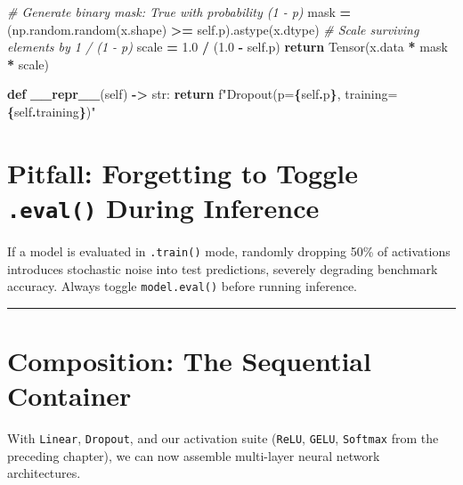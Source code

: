 \documentclass[
  letterpaper,
]{scrbook}
\newenvironment{Shaded}{\begin{snugshade}}{\end{snugshade}}
\newcommand{\BuiltInTok}[1]{#1}
\newcommand{\CommentTok}[1]{\textcolor[rgb]{0.56,0.35,0.01}{\textit{#1}}}
\newcommand{\ControlFlowTok}[1]{\textcolor[rgb]{0.13,0.29,0.53}{\textbf{#1}}}
\newcommand{\FloatTok}[1]{\textcolor[rgb]{0.00,0.00,0.81}{#1}}
\newcommand{\FunctionTok}[1]{\textcolor[rgb]{0.13,0.29,0.53}{\textbf{#1}}}
\newcommand{\KeywordTok}[1]{\textcolor[rgb]{0.13,0.29,0.53}{\textbf{#1}}}
\newcommand{\NormalTok}[1]{#1}
\newcommand{\OperatorTok}[1]{\textcolor[rgb]{0.81,0.36,0.00}{\textbf{#1}}}
\newcommand{\SpecialCharTok}[1]{\textcolor[rgb]{0.81,0.36,0.00}{\textbf{#1}}}
\newcommand{\SpecialStringTok}[1]{\textcolor[rgb]{0.31,0.60,0.02}{#1}}
\newcommand{\VariableTok}[1]{\textcolor[rgb]{0.00,0.00,0.00}{#1}}
\begin{document}
\begin{Shaded}
\begin{Highlighting}[]
        \CommentTok{\# Generate binary mask: True with probability (1 {-} p)}
\NormalTok{        mask }\OperatorTok{=}\NormalTok{ (np.random.random(x.shape) }\OperatorTok{\textgreater{}=} \VariableTok{self}\NormalTok{.p).astype(x.dtype)}
        \CommentTok{\# Scale surviving elements by 1 / (1 {-} p)}
\NormalTok{        scale }\OperatorTok{=} \FloatTok{1.0} \OperatorTok{/}\NormalTok{ (}\FloatTok{1.0} \OperatorTok{{-}} \VariableTok{self}\NormalTok{.p)}
        \ControlFlowTok{return}\NormalTok{ Tensor(x.data }\OperatorTok{*}\NormalTok{ mask }\OperatorTok{*}\NormalTok{ scale)}

    \KeywordTok{def} \FunctionTok{\_\_repr\_\_}\NormalTok{(}\VariableTok{self}\NormalTok{) }\OperatorTok{{-}\textgreater{}} \BuiltInTok{str}\NormalTok{:}
        \ControlFlowTok{return} \SpecialStringTok{f"Dropout(p=}\SpecialCharTok{\{}\VariableTok{self}\SpecialCharTok{.}\NormalTok{p}\SpecialCharTok{\}}\SpecialStringTok{, training=}\SpecialCharTok{\{}\VariableTok{self}\SpecialCharTok{.}\NormalTok{training}\SpecialCharTok{\}}\SpecialStringTok{)"}
\end{Highlighting}
\end{Shaded}

\section{\texorpdfstring{Pitfall: Forgetting to Toggle \texttt{.eval()}
During
Inference}{Pitfall: Forgetting to Toggle .eval() During Inference}}\label{pitfall-forgetting-to-toggle-.eval-during-inference}

If a model is evaluated in \texttt{.train()} mode, randomly dropping
50\% of activations introduces stochastic noise into test predictions,
severely degrading benchmark accuracy. Always toggle
\texttt{model.eval()} before running inference.

\begin{center}\rule{0.5\linewidth}{0.5pt}\end{center}

\section{Composition: The Sequential
Container}\label{composition-the-sequential-container}

With \texttt{Linear}, \texttt{Dropout}, and our activation suite
(\texttt{ReLU}, \texttt{GELU}, \texttt{Softmax} from the preceding
chapter), we can now assemble multi-layer neural network architectures.
\end{document}
